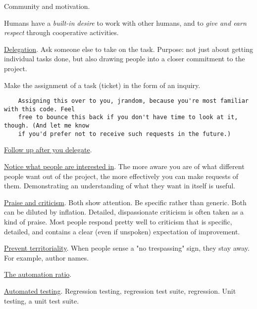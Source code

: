 \documentclass[landscape,30pt]{foils}
\begin{document}

Community and motivation.

Humans have a {\em built-in desire} to work with other humans, and to {\em give and earn respect} through cooperative activities.



\underline{Delegation}.  Ask someone else to take on the task.  Purpose: not just about getting individual tasks done, but also drawing people into a closer commitment to the project.

Make the assignment of a task (ticket) in the form of an inquiry.

{\tiny
\begin{verbatim}
    Assigning this over to you, jrandom, because you're most familiar with this code. Feel
    free to bounce this back if you don't have time to look at it, though. (And let me know
    if you'd prefer not to receive such requests in the future.)
\end{verbatim}
}

\underline{Follow up after you delegate}.

\underline{Notice what people are interested in}.  The more aware you are of what different people want out of the project, the more effectively you can make requests of them.  Demonstrating an understanding of what they want in itself is useful.

\underline{Praise and criticism}.  Both show attention.  Be specific rather than generic.  Both can be diluted by inflation.  Detailed, dispassionate criticism is often taken as a kind of praise.  Most people respond pretty well to criticism that is specific,
detailed, and contains a clear (even if unspoken) expectation of improvement.

\underline{Prevent territoriality}.  When people sense a "no trespassing" sign, they stay away.  For example, author names.

\underline{The automation ratio}.

\underline{Automated testing}.  Regression testing, regression test suite, regression.  Unit testing, a unit test suite.


\end{document}
